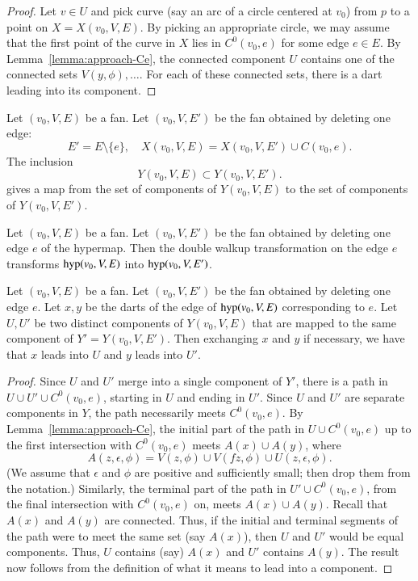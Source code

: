 \begin{proof}  Let $v\in U$ and pick curve (say an arc of a
circle centered at $v_0$) from $p$ to a point on $X=X(v_0,V,E)$.
By picking an appropriate circle, 
we may assume that the first point of the curve in $X$ lies
in $C^0(v_0,e)$ for some edge $e\in E$.  
By Lemma~\ref{lemma:approach-Ce},
the connected component $U$ contains one of the connected
sets $V(y,\phi),\ldots$.
For each of these connected sets, there is a dart leading
into its component.
\end{proof}

\begin{lemma}
Let $(v_0,V,E)$ be a fan.  Let $(v_0,V,E')$
be the fan obtained by deleting one edge:
  $$
  E' = E\setminus\{e\}, \quad X(v_0,V,E) = X(v_0,V,E')\cup C(v_0,e).
  $$
The inclusion  $$Y(v_0,V,E) \subset Y(v_0,V,E').
   $$
gives a map
from the set of components
of $Y(v_0,V,E)$ to the set of components
of $Y(v_0,V,E')$.
\end{lemma}

\begin{lemma}\label{lemma:pre-walkup}
Let $(v_0,V,E)$ be a fan.  Let $(v_0,V,E')$
be the fan obtained by deleting one edge $e$
of the hypermap.
Then the double walkup transformation on the edge $e$
transforms ${\operatorname{hyp}}(v_0,V,E)$ into
${\operatorname{hyp}}(v_0,V,E')$.
\end{lemma}


\begin{lemma}\label{lemma:join-comp}
Let $(v_0,V,E)$ be a fan.  Let $(v_0,V,E')$
be the fan obtained by deleting one edge $e$.
Let $x,y$ be the darts of the edge of
${\operatorname{hyp}}(v_0,V,E)$ corresponding
to $e$.
Let $U,U'$ be two distinct
components of $Y(v_0,V,E)$ that are mapped
to the same component of $Y'=Y(v_0,V,E')$.  Then exchanging
$x$ and $y$ if necessary, we have that $x$ leads into $U$
and $y$ leads into $U'$.
\end{lemma}

\begin{proof}
Since $U$ and $U'$ merge into a single component of $Y'$,
there is a path in $U\cup U'\cup C^0(v_0,e)$, starting in $U$
and ending in $U'$.  Since $U$ and $U'$ are separate components
in $Y$, the path necessarily meets $C^0(v_0,e)$.
By Lemma~\ref{lemma:approach-Ce}, the
initial part of the path in $U\cup C^0(v_0,e)$ up to the first
intersection with $C^0(v_0,e)$ meets $A(x)\cup A(y)$, where
  $$
  A(z,\epsilon,\phi) = 
    V(z,\phi) \cup V(f z,\phi) 
  \cup U(z,\epsilon,\phi).
  $$
(We assume that $\epsilon$ and $\phi$ are positive and sufficiently
small; then drop them from the notation.)
Similarly, the terminal part of the path in $U'\cup C^0(v_0,e)$, 
from the
final intersection with $C^0(v_0,e)$ on, meets $A(x)\cup A(y)$.
Recall that $A(x)$ and $A(y)$ are connected.  Thus,
if the initial and terminal segments of the path were to
meet the
same set (say $A(x)$), then $U$ and $U'$ would be equal components.
Thus, $U$ contains (say) $A(x)$ and $U'$ contains $A(y)$.
The result now follows from the definition of what it means
to lead into a component.
\end{proof}


